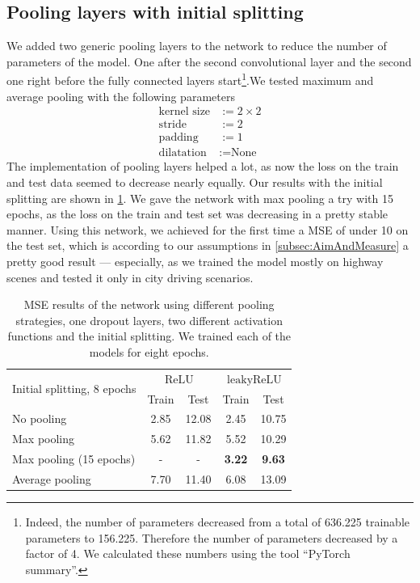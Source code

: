 \documentclass[conference]{IEEEtran}
\begin{document}
\subsection{Pooling layers with initial splitting}
We added two generic pooling layers to the network to reduce the number of parameters of the model. One after the second 
convolutional layer and the second one right before the fully connected layers start\footnote{Indeed, the number of 
parameters decreased from a total of 636.225 trainable parameters to 156.225. Therefore the number of parameters decreased by a 
factor of 4. We calculated these numbers using the tool \enquote{PyTorch summary}.}.We tested maximum and average pooling with the following 
parameters
\begin{align*}
\text{kernel size} &:= 2\times 2\\
\text{stride} &:= 2\\
\text{padding} &:= 1\\
\text{dilatation} &:= \text{None}
\end{align*}
The implementation of pooling layers helped a lot, as now the loss on the train and test data seemed to decrease 
nearly equally. Our results with the initial splitting are shown in \cref{tab:ResultsInitialSplitting}. We gave the network
with max pooling a try with 15 epochs, as the loss on the train and test set was decreasing in a pretty stable manner. Using this
network, we achieved for the first time a MSE of under 10 on the test set, which is according to our assumptions in \cref{subsec:AimAndMeasure} a 
pretty good result --- especially, as we trained the model mostly on highway scenes and tested it only in city driving scenarios.
\begin{table}[!t]
\normalsize
\centering
\begin{tabular}{lcccc}
\toprule
\multirow{2}{*}{Initial splitting, 8 epochs}  & \multicolumn{2}{c}{$\mathrm{ReLU}$} & \multicolumn{2}{c}{$\mathrm{leakyReLU}$} \\
 & Train & Test & Train & Test\\
\midrule
No pooling & 2.85 & 12.08 & 2.45 & 10.75 \\
Max pooling & 5.62 & 11.82 & 5.52 & 10.29 \\
Max pooling (15 epochs) & - & - & \textbf{3.22} & \textbf{9.63} \\
Average pooling & 7.70 & 11.40 & 6.08 & 13.09\\
\bottomrule
\end{tabular}
\caption{MSE results of the network using different pooling strategies, one dropout layers, two different activation functions and 
the initial splitting. We trained each of the models for eight epochs.}
\label{tab:ResultsInitialSplitting}
\end{table}
\end{document}
